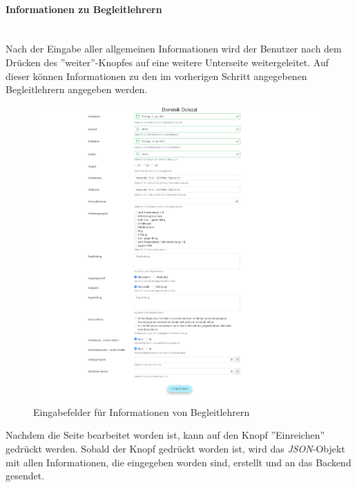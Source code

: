 \paragraph{Informationen zu Begleitlehrern}~\\
Nach der Eingabe aller allgemeinen Informationen wird der Benutzer nach dem Drücken des ''weiter''-Knopfes auf eine weitere Unterseite weitergeleitet. Auf dieser können Informationen zu den im vorherigen Schritt angegebenen Begleitlehrern angegeben werden.
\begin{figure}[H]
	\centering
	\includegraphics[width=0.7\linewidth]{images/escorts}
	\caption[Schulveranstaltung 2]{Eingabefelder für Informationen von Begleitlehrern}
	\label{fig:escorts}
\end{figure}
\newpage
Nachdem die Seite bearbeitet worden ist, kann auf den Knopf ''Einreichen'' gedrückt werden. Sobald der Knopf gedrückt worden ist, wird das \textit{JSON}-Objekt mit allen Informationen, die eingegeben worden sind, erstellt und an das Backend gesendet.
\label{code_submit_data}
